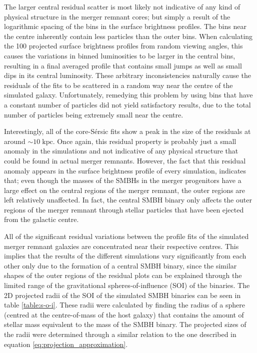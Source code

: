 \documentclass[english, twoside]{HYgradu}
\begin{document}
The larger central residual scatter is most likely not indicative of any kind of physical structure in the merger remnant cores; but simply a result of the logarithmic spacing of the bins in the surface brightness profiles. The bins near the centre inherently contain less particles than the outer bins. When calculating the 100 projected surface brightness profiles from random viewing angles, this causes the variations in binned luminosities to be larger in the central bins, resulting in a final averaged profile that contains small jumps as well as small dips in its central luminosity. These arbitrary inconsistencies naturally cause the residuals of the fits to be scattered in a random way near the centre of the simulated galaxy. Unfortunately, remedying this problem by using bins that have a constant number of particles did not yield satisfactory results, due to the total number of particles being extremely small near the centre.

Interestingly, all of the core-Sérsic fits show a peak in the size of the residuals at around $\sim 10 \; \mathrm{kpc}$. Once again, this residual property is probably just a small anomaly in the simulations and not indicative of any physical structure that could be found in actual merger remnants. However, the fact that this residual anomaly appears in the surface brightness profile of every simulation, indicates that; even though the masses of the SMBHs in the merger progenitors have a large effect on the central regions of the merger remnant, the outer regions are left relatively unaffected. In fact, the central SMBH binary only affects the outer regions of the merger remnant through stellar particles that have been ejected from the galactic centre. 

All of the significant residual variations between the profile fits of the simulated merger remnant galaxies are concentrated near their respective centres. This implies that the results of the different simulations vary significantly from each other only due to the formation of a central SMBH binary, since the similar shapes of the outer regions of the residual plots can be explained through the limited range of the gravitational spheres-of-influence (SOI) of the binaries. The 2D projected radii of the SOI of the simulated SMBH binaries can be seen in table \ref{table:s-o-i}. These radii were calculated by finding the radius of a sphere (centred at the centre-of-mass of the host galaxy) that contains the amount of stellar mass equivalent to the mass of the SMBH binary. The projected sizes of the radii were determined through a similar relation to the one described in equation \ref{eq:projection_approximation}.
\end{document}
